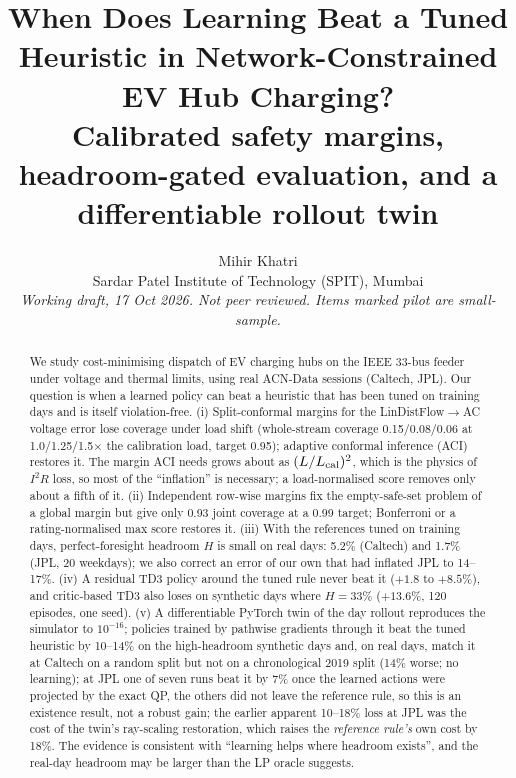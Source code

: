 \documentclass[10pt]{article}
\title{When Does Learning Beat a Tuned Heuristic in Network-Constrained EV Hub Charging?\\
\large Calibrated safety margins, headroom-gated evaluation, and a differentiable rollout twin}
\author{Mihir Khatri\\ \small Sardar Patel Institute of Technology (SPIT), Mumbai\\ \small \textit{Working draft, 17 Oct 2026. Not peer reviewed. Items marked pilot are small-sample.}}
\date{}
\begin{document}
\maketitle

\begin{abstract}
We study cost-minimising dispatch of EV charging hubs on the IEEE 33-bus feeder under voltage and thermal limits, using real ACN-Data sessions (Caltech, JPL).
Our question is when a learned policy can beat a heuristic that has been tuned on training days and is itself violation-free.
(i) Split-conformal margins for the LinDistFlow$\to$AC voltage error lose coverage under load shift (whole-stream coverage 0.15/0.08/0.06 at 1.0/1.25/1.5$\times$ the calibration load, target 0.95); adaptive conformal inference (ACI) restores it. The margin ACI needs grows about as $(L/L_{\rm cal})^2$, which is the physics of $I^2R$ loss, so most of the ``inflation'' is necessary; a load-normalised score removes only about a fifth of it.
(ii) Independent row-wise margins fix the empty-safe-set problem of a global margin but give only 0.93 joint coverage at a 0.99 target; Bonferroni or a rating-normalised max score restores it.
(iii) With the references tuned on training days, perfect-foresight headroom $H$ is small on real days: 5.2\% (Caltech) and 1.7\% (JPL, 20 weekdays); we also correct an error of our own that had inflated JPL to 14--17\%.
(iv) A residual TD3 policy around the tuned rule never beat it ($+1.8$ to $+8.5\%$), and critic-based TD3 also loses on synthetic days where $H=33\%$ ($+13.6\%$, 120 episodes, one seed).
(v) A differentiable PyTorch twin of the day rollout reproduces the simulator to $10^{-16}$; policies trained by pathwise gradients through it beat the tuned heuristic by 10--14\% on the high-headroom synthetic days and, on real days, match it at Caltech on a random split but not on a chronological 2019 split (14\% worse; no learning); at JPL one of seven runs beat it by 7\% once the learned actions were projected by the exact QP, the others did not leave the reference rule, so this is an existence result, not a robust gain; the earlier apparent 10--18\% loss at JPL was the cost of the twin's ray-scaling restoration, which raises the \emph{reference rule's} own cost by 18\%. The evidence is consistent with ``learning helps where headroom exists'', and the real-day headroom may be larger than the LP oracle suggests.
\end{abstract}
\end{document}
